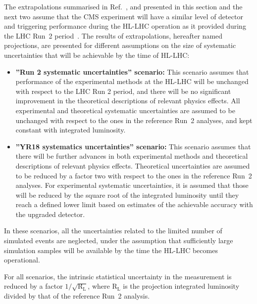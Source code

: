 The extrapolations summarised in Ref.~\cite{CMS-PAS-FTR-18-035},  and presented in this section and the next two assume that the CMS experiment will have a similar level of detector and triggering performance during the HL-LHC operation as it provided during the LHC Run~2
period~\cite{CMSCollaboration:2015zni, Klein:2017nke, Collaboration:2283187, Collaboration:2293646, Collaboration:2283189}.  
The results of extrapolations, hereafter named projections, are presented for different assumptions on the
size of systematic uncertainties that will be achievable by the time of HL-LHC:
\begin{itemize}
\item {\bf ''Run 2 systematic uncertainties'' scenario:} This scenario assumes that performance of the experimental methods at the HL-LHC will be unchanged with respect to the LHC Run 2 period, and there will be no significant improvement in the theoretical descriptions of relevant physics effects. All experimental and
theoretical systematic uncertainties are assumed to be unchanged with respect to the ones in
the reference Run~2 analyses, and kept constant with integrated luminosity.
\item {\bf ''YR18 systematics uncertainties'' scenario:} This scenario assumes that there will be further
advances in both experimental methods and theoretical descriptions of relevant physics effects.
Theoretical uncertainties are assumed to be reduced by a factor two with respect to the ones in the reference
Run~2 analyses. For experimental systematic uncertainties, it is assumed that those will be reduced by the square root
of the integrated luminosity until they reach a defined lower limit based on estimates of
the achievable accuracy with the upgraded detector.
\end{itemize}

In these scenarios, all the uncertainties related to the limited number of simulated events are neglected,
 under the assumption that sufficiently large simulation samples will be available by the time the HL-LHC becomes operational.

For all scenarios, the intrinsic statistical uncertainty in the measurement is reduced by a
factor $1/\sqrt{\text{R}_\text{L}}$, where $\text{R}_\text{L}$ is the projection integrated luminosity divided by that of the
reference Run~2 analysis.

